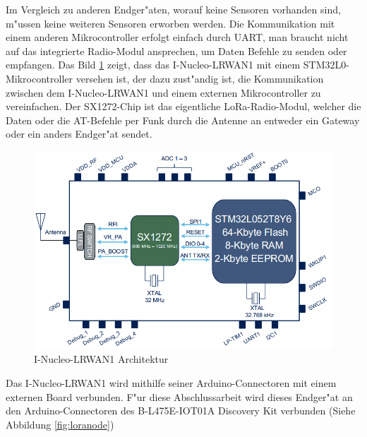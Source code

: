 Im Vergleich zu anderen Endger"aten, worauf keine Sensoren vorhanden 
sind, m"ussen keine weiteren Sensoren erworben werden. Die 
Kommunikation mit einem anderen Mikrocontroller erfolgt einfach durch 
UART, man braucht nicht auf das integrierte Radio-Modul ansprechen, um Daten 
Befehle zu senden oder  empfangen. Das Bild 
\ref{fig:loraMod_intern} zeigt, dass das I-Nucleo-LRWAN1 mit einem 
STM32L0-Mikrocontroller versehen ist, der dazu zust"andig ist, die 
Kommunikation zwischen dem I-Nucleo-LRWAN1 und einem externen 
Mikrocontroller zu vereinfachen. Der SX1272-Chip ist das eigentliche 
LoRa-Radio-Modul, welcher die Daten oder die AT-Befehle per Funk durch die 
Antenne an entweder ein Gateway oder ein anders Endger"at sendet. 

\begin{figure}[h]
	\centering
	\includegraphics[width=14cm]{source/images/LoRa_Intern}
	\caption{I-Nucleo-LRWAN1 Architektur 
	\cite{LoRaMod}\label{fig:loraMod_intern}}
\end{figure}

\vspace{10cm}
Das I-Nucleo-LRWAN1 wird mithilfe seiner Arduino-Connectoren mit einem 
externen Board verbunden. F"ur diese Abschlussarbeit wird dieses 
Endger"at an den Arduino-Connectoren des B-L475E-IOT01A Discovery Kit 
verbunden (Siehe Abbildung \ref{fig:loranode})

